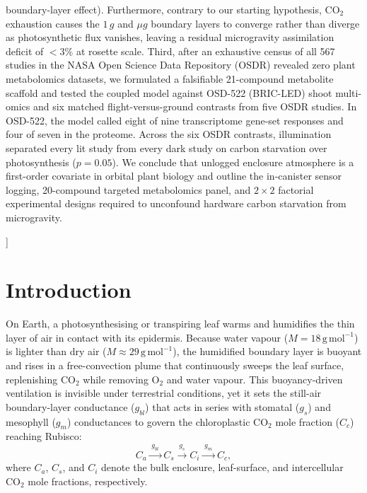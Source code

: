 \documentclass[10pt,twocolumn,a4paper]{article}
\begin{document}
{\begin{tcolorbox}[colback=npjlgtgray,colframe=npjteal,arc=3mm,left=4mm,right=4mm,top=3mm,bottom=3mm,boxrule=1.2pt]
{boundary-layer effect). Furthermore, contrary to our starting hypothesis, $\mathrm{CO_2}$ exhaustion causes the $1\,g$ and $\mu g$ boundary layers to converge rather than diverge as photosynthetic flux vanishes, leaving a residual microgravity assimilation deficit of $<3\%$ at rosette scale. Third, after an exhaustive census of all 567 studies in the NASA Open Science Data Repository (OSDR) revealed zero plant metabolomics datasets, we formulated a falsifiable 21-compound metabolite scaffold and tested the coupled model against OSD-522 (BRIC-LED) shoot multi-omics and six matched flight-versus-ground contrasts from five OSDR studies. In OSD-522, the model called eight of nine transcriptome gene-set responses and four of seven in the proteome. Across the six OSDR contrasts, illumination separated every lit study from every dark study on carbon starvation over photosynthesis ($p = 0.05$). We conclude that unlogged enclosure atmosphere is a first-order covariate in orbital plant biology and outline the in-canister sensor logging, 20-compound targeted metabolomics panel, and $2\times 2$ factorial experimental designs required to unconfound hardware carbon starvation from microgravity.}
  \end{tcolorbox}
  \vspace{4mm}
}]

\section*{Introduction}\label{sec:intro}

On Earth, a photosynthesising or transpiring leaf warms and humidifies the thin layer of air in contact with its epidermis. Because water vapour ($M = 18\,\mathrm{g\,mol^{-1}}$) is lighter than dry air ($M \approx 29\,\mathrm{g\,mol^{-1}}$), the humidified boundary layer is buoyant and rises in a free-convection plume that continuously sweeps the leaf surface, replenishing $\mathrm{CO_2}$ while removing $\mathrm{O_2}$ and water vapour. This buoyancy-driven ventilation is invisible under terrestrial conditions, yet it sets the still-air boundary-layer conductance ($g_{bl}$) that acts in series with stomatal ($g_s$) and mesophyll ($g_m$) conductances to govern the chloroplastic $\mathrm{CO_2}$ mole fraction ($C_c$) reaching Rubisco:
\begin{equation}
C_a \xrightarrow{\;g_{bl}\;} C_s \xrightarrow{\;g_s\;} C_i \xrightarrow{\;g_m\;} C_c ,
\label{eq:conductance_chain}
\end{equation}
where $C_a$, $C_s$, and $C_i$ denote the bulk enclosure, leaf-surface, and intercellular $\mathrm{CO_2}$ mole fractions, respectively.
\end{document}
